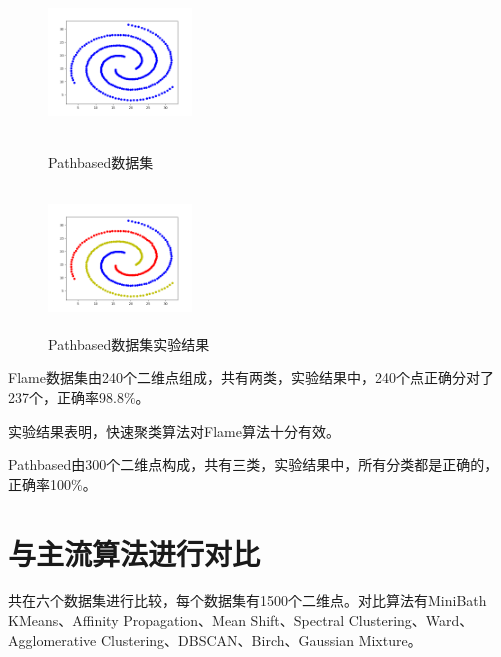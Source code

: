\documentclass{article}
\begin{document}
\begin{figure}[!htp]
\centering
    \begin{minipage}[c]{0.5\textwidth}
        \centering
      \includegraphics[height=1.5in,width=1.5in]{pathbased}
      \caption{Pathbased数据集}\label{aa}
    \end{minipage}%
    \begin{minipage}[c]{0.5\textwidth}
        \centering
      \includegraphics[height=1.5in,width=1.5in]{pathbased2}
      \caption{Pathbased数据集实验结果}\label{aa}
    \end{minipage}
\end{figure}
    Flame数据集由240个二维点组成，共有两类，实验结果中，240个点正确分对了237个，正确率98.8$\%$。
    
    实验结果表明，快速聚类算法对Flame算法十分有效。




    Pathbased由300个二维点构成，共有三类，实验结果中，所有分类都是正确的，正确率100\%。
    \section{与主流算法进行对比}
    共在六个数据集进行比较，每个数据集有1500个二维点。对比算法有MiniBath KMeans、Affinity Propagation、Mean Shift、Spectral Clustering、Ward、Agglomerative Clustering、DBSCAN、Birch、Gaussian Mixture。
    
\end{document}
